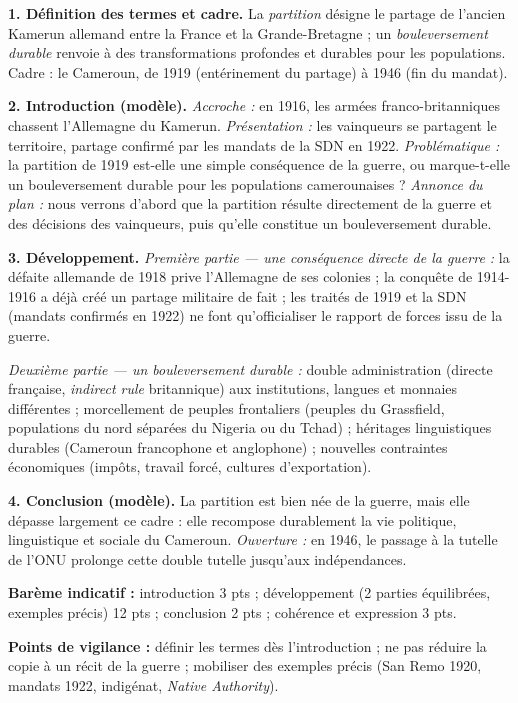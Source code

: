 \documentclass[11pt]{article}
\begin{document}
\begin{corrige}
\textbf{1. Définition des termes et cadre.} La \emph{partition} désigne le partage de l'ancien Kamerun allemand entre la France et la Grande-Bretagne ; un \emph{bouleversement durable} renvoie à des transformations profondes et durables pour les populations. Cadre : le Cameroun, de 1919 (entérinement du partage) à 1946 (fin du mandat).

\textbf{2. Introduction (modèle).} \emph{Accroche :} en 1916, les armées franco-britanniques chassent l'Allemagne du Kamerun. \emph{Présentation :} les vainqueurs se partagent le territoire, partage confirmé par les mandats de la SDN en 1922. \emph{Problématique :} la partition de 1919 est-elle une simple conséquence de la guerre, ou marque-t-elle un bouleversement durable pour les populations camerounaises ? \emph{Annonce du plan :} nous verrons d'abord que la partition résulte directement de la guerre et des décisions des vainqueurs, puis qu'elle constitue un bouleversement durable.

\textbf{3. Développement.}
\emph{Première partie — une conséquence directe de la guerre :} la défaite allemande de 1918 prive l'Allemagne de ses colonies ; la conquête de 1914-1916 a déjà créé un partage militaire de fait ; les traités de 1919 et la SDN (mandats confirmés en 1922) ne font qu'officialiser le rapport de forces issu de la guerre.

\emph{Deuxième partie — un bouleversement durable :} double administration (directe française, \emph{indirect rule} britannique) aux institutions, langues et monnaies différentes ; morcellement de peuples frontaliers (peuples du Grassfield, populations du nord séparées du Nigeria ou du Tchad) ; héritages linguistiques durables (Cameroun francophone et anglophone) ; nouvelles contraintes économiques (impôts, travail forcé, cultures d'exportation).

\textbf{4. Conclusion (modèle).} La partition est bien née de la guerre, mais elle dépasse largement ce cadre : elle recompose durablement la vie politique, linguistique et sociale du Cameroun. \emph{Ouverture :} en 1946, le passage à la tutelle de l'ONU prolonge cette double tutelle jusqu'aux indépendances.

\textbf{Barème indicatif :} introduction 3 pts ; développement (2 parties équilibrées, exemples précis) 12 pts ; conclusion 2 pts ; cohérence et expression 3 pts.

\textbf{Points de vigilance :} définir les termes dès l'introduction ; ne pas réduire la copie à un récit de la guerre ; mobiliser des exemples précis (San Remo 1920, mandats 1922, indigénat, \emph{Native Authority}).
\end{corrige}
\end{document}
